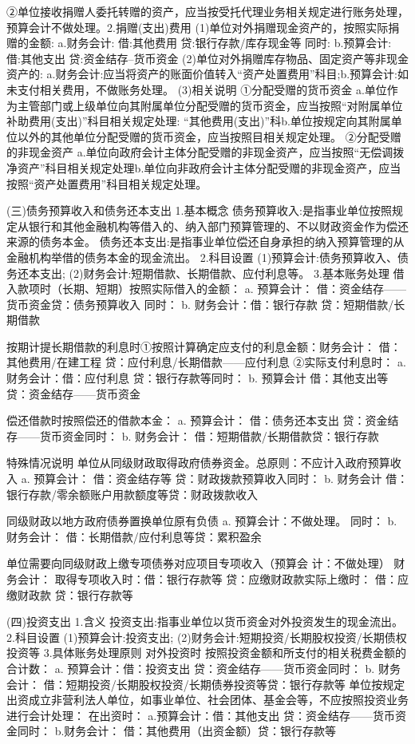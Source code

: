 \documentclass[UTF8,12pt]{ctexart}
\numberwithin{equation}{section} %
\numberwithin{figure}{section}
\numberwithin{table}{section}
\begin{document}
	②单位接收捐赠人委托转赠的资产，应当按受托代理业务相关规定进行账务处理，预算会计不做处理。2.捐赠(支出)费用
	(1)单位对外捐赠现金资产的，按照实际捐赠的金额:
	a.财务会计:
	借:其他费用
	贷:银行存款/库存现金等
	同时:
	b.预算会计:
	借:其他支出
	贷:资金结存--货币资金
	(2)单位对外捐赠库存物品、固定资产等非现金资产的:
	a.财务会计:应当将资产的账面价值转入“资产处置费用”科目;b.预算会计:如未支付相关费用，不做账务处理。
	(3)相关说明
	①分配受赠的货币资金
	a.单位作为主管部门或上级单位向其附属单位分配受赠的货币资金，应当按照“对附属单位补助费用(支出)”科目相关规定处理:
	“其他费用(支出)”科b.单位按规定向其附属单位以外的其他单位分配受赠的货币资金，应当按照目相关规定处理。
	②分配受赠的非现金资产
	a.单位向政府会计主体分配受赠的非现金资产，应当按照“无偿调拨净资产”科目相关规定处理b.单位向非政府会计主体分配受赠的非现金资产，应当按照“资产处置费用”科目相关规定处理。
	
	(三)债务预算收入和债务还本支出
	1.基本概念
	债务预算收入:是指事业单位按照规定从银行和其他金融机构等借入的、纳入部门预算管理的、不以财政资金作为偿还来源的债务本金。
	债务还本支出:是指事业单位偿还自身承担的纳入预算管理的从金融机构举借的债务本金的现金流出。
	2.科目设置
	(1)预算会计:债务预算收入、债务还本支出;
	(2)财务会计:短期借款、长期借款、应付利息等。
	3.基本账务处理
	借入款项时（长期、短期）按照实际借入的金额：
	a.	预算会计：
	借：资金结存——货币资金贷：债务预算收入
	同时：
	b.	财务会计：借：银行存款
	贷：短期借款/长期借款
	
	按期计提长期借款的利息时①按照计算确定应支付的利息金额：财务会计：
	借：其他费用/在建工程
	贷：应付利息/长期借款——应付利息
	②实际支付利息时：
	a.	财务会计：借：应付利息
	贷：银行存款等同时：
	b.	预算会计
	借：其他支出等
	贷：资金结存——货币资金
	
	偿还借款时按照偿还的借款本金：
	a.	预算会计：
	借：债务还本支出
	贷：资金结存——货币资金同时：
	b.	财务会计：
	借：短期借款/长期借款贷：银行存款
	
	特殊情况说明
	单位从同级财政取得政府债券资金。总原则：不应计入政府预算收入
	a.	预算会计： 借：资金结存等
	贷：财政拨款预算收入同时：
	b.	财务会计
	借：银行存款/零余额账户用款额度等贷：财政拨款收入
	
	
	同级财政以地方政府债券置换单位原有负债
	a.	预算会计：不做处理。 同时：
	b.	财务会计：
	借：长期借款/应付利息等贷：累积盈余
	
	
	单位需要向同级财政上缴专项债券对应项目专项收入（预算会 计：不做处理）
	财务会计：
	取得专项收入时：借：银行存款等
	贷：应缴财政款实际上缴时：
	借：应缴财政款 贷：银行存款等
	
	(四)投资支出
	1.含义
	投资支出:指事业单位以货币资金对外投资发生的现金流出。
	2.科目设置
	(1)预算会计:投资支出;
	(2)财务会计:短期投资/长期股权投资/长期债权投资等
	3.具体账务处理原则
	对外投资时
	按照投资金额和所支付的相关税费金额的合计数：
	a.	预算会计：借：投资支出
	贷：资金结存——货币资金同时：
	b.	财务会计：
	借：短期投资/长期股权投资/长期债券投资等贷：银行存款等
	单位按规定出资成立非营利法人单位，如事业单位、社会团体、基金会等，不应按照投资业务进行会计处理：
	在出资时： a.预算会计：借：其他支出
	贷：资金结存——货币资金同时：
	b.财务会计：
	借：其他费用（出资金额）贷：银行存款等
	
\end{document}
